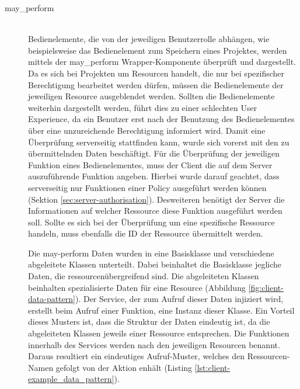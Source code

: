 \begin{description}
	\item[may\_perform]\hfill\\
	Bedienelemente, die von der jeweiligen Benutzerrolle abhängen, wie beispielsweise das Bedienelement zum Speichern eines Projektes, werden mittels der may\_perform Wrapper-Komponente überprüft und dargestellt. Da es sich bei Projekten um Resourcen handelt, die nur bei spezifischer Berechtigung bearbeitet werden dürfen, müssen die Bedienelemente der jeweiligen Resource ausgeblendet werden. Sollten die Bedienelemente weiterhin dargestellt werden, führt dies zu einer schlechten User Experience, da ein Benutzer erst nach der Benutzung des Bedienelementes über eine unzureichende Berechtigung informiert wird. Damit eine Überprüfung serverseitig stattfinden kann, wurde sich vorerst mit den zu übermittelnden Daten beschäftigt. Für die Überprüfung der jeweiligen Funktion eines Bedienelementes, muss der Client die auf dem Server auszuführende Funktion angeben. Hierbei wurde darauf geachtet, dass serverseitig nur Funktionen einer Policy ausgeführt werden können (Sektion \ref{sec:server-authorisation}). Desweiteren benötigt der Server die Informationen auf welcher Ressource diese Funktion ausgeführt werden soll. Sollte es sich bei der Überprüfung um eine spezifische Ressource handeln, muss ebenfalls die ID der Ressource übermittelt werden.

	\begin{minipage}{\linewidth}
		
	\end{minipage}

	Die may-perform Daten wurden in eine Basisklasse und verschiedene abgeleitete Klassen unterteilt. Dabei beinhaltet die Basisklasse jegliche Daten, die ressourcenübergreifend sind. Die abgeleiteten Klassen beinhalten spezialisierte Daten für eine Resource (Abbildung \ref{fig:client-data-pattern}). Der Service, der zum Aufruf dieser Daten injiziert wird, erstellt beim Aufruf einer Funktion, eine Instanz dieser Klasse. Ein Vorteil dieses Musters ist, dass die Struktur der Daten eindeutig ist, da die abgeleiteten Klassen jeweils einer Ressource entsprechen. Die Funktionen innerhalb des Services werden nach den jeweiligen Resourcen benannt. Daraus resultiert ein eindeutiges Aufruf-Muster, welches den Ressourcen-Namen gefolgt von der Aktion enhält (Listing \ref{lst:client-example_data_pattern}).


\end{description}
